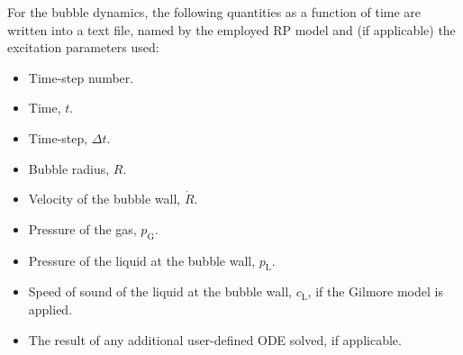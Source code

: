 For the bubble dynamics, the following quantities as a function of time are written into a text file, named by the employed RP model and (if applicable) the excitation parameters used:\vspace{-1em}
\begin{itemize}[noitemsep]
  \item Time-step number.
  \item Time, $t$.
  \item Time-step, $\Delta t$.
  \item Bubble radius, $R$.
  \item Velocity of the bubble wall, $\dot{R}$.
  \item Pressure of the gas, $p_\mathrm{G}$.
  \item Pressure of the liquid at the bubble wall, $p_\mathrm{L}$.
  \item Speed of sound of the liquid at the bubble wall, $c_\mathrm{L}$, if the Gilmore model is applied.
  \item The result of any additional user-defined ODE solved, if applicable.
\end{itemize}